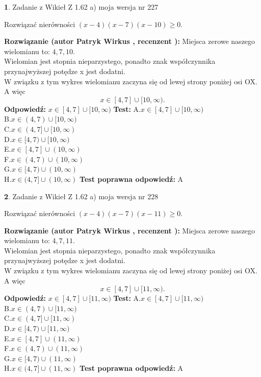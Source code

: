 \documentclass[12pt, a4paper]{article}
\theoremstyle{definition} %
\newtheorem{zad}{}
\newcommand{\zadStart}[1]{\begin{zad}#1\newline}
\newcommand{\zadStop}{\end{zad}}
\newcommand{\rozwStart}[2]{\noindent \textbf{Rozwiązanie (autor #1 , recenzent #2): }\newline}
\newcommand{\rozwStop}{\newline}
\newcommand{\odpStart}{\noindent \textbf{Odpowiedź:}\newline}
\newcommand{\odpStop}{\newline}
\newcommand{\testStart}{\noindent \textbf{Test:}\newline}
\newcommand{\testStop}{\newline}
\newcommand{\kluczStart}{\noindent \textbf{Test poprawna odpowiedź:}\newline}
\newcommand{\kluczStop}{\newline}
\begin{document}
\zadStart{Zadanie z Wikieł Z 1.62 a) moja wersja nr 227}

Rozwiązać nierówności $(x-4)(x-7)(x-10)\ge0$.
\zadStop
\rozwStart{Patryk Wirkus}{}
Miejsca zerowe naszego wielomianu to: $4, 7, 10$.\\
Wielomian jest stopnia nieparzystego, ponadto znak współczynnika przy\linebreak najwyższej potędze x jest dodatni.\\ W związku z tym wykres wielomianu zaczyna się od lewej strony poniżej osi OX. A więc $$x \in [4,7] \cup [10,\infty).$$
\rozwStop
\odpStart
$x \in [4,7] \cup [10,\infty)$
\odpStop
\testStart
A.$x \in [4,7] \cup [10,\infty)$\\
B.$x \in (4,7) \cup [10,\infty)$\\
C.$x \in (4,7] \cup [10,\infty)$\\
D.$x \in [4,7) \cup [10,\infty)$\\
E.$x \in [4,7] \cup (10,\infty)$\\
F.$x \in (4,7) \cup (10,\infty)$\\
G.$x \in [4,7) \cup (10,\infty)$\\
H.$x \in (4,7] \cup (10,\infty)$
\testStop
\kluczStart
A
\kluczStop



\zadStart{Zadanie z Wikieł Z 1.62 a) moja wersja nr 228}

Rozwiązać nierówności $(x-4)(x-7)(x-11)\ge0$.
\zadStop
\rozwStart{Patryk Wirkus}{}
Miejsca zerowe naszego wielomianu to: $4, 7, 11$.\\
Wielomian jest stopnia nieparzystego, ponadto znak współczynnika przy\linebreak najwyższej potędze x jest dodatni.\\ W związku z tym wykres wielomianu zaczyna się od lewej strony poniżej osi OX. A więc $$x \in [4,7] \cup [11,\infty).$$
\rozwStop
\odpStart
$x \in [4,7] \cup [11,\infty)$
\odpStop
\testStart
A.$x \in [4,7] \cup [11,\infty)$\\
B.$x \in (4,7) \cup [11,\infty)$\\
C.$x \in (4,7] \cup [11,\infty)$\\
D.$x \in [4,7) \cup [11,\infty)$\\
E.$x \in [4,7] \cup (11,\infty)$\\
F.$x \in (4,7) \cup (11,\infty)$\\
G.$x \in [4,7) \cup (11,\infty)$\\
H.$x \in (4,7] \cup (11,\infty)$
\testStop
\kluczStart
A
\kluczStop
\end{document}
